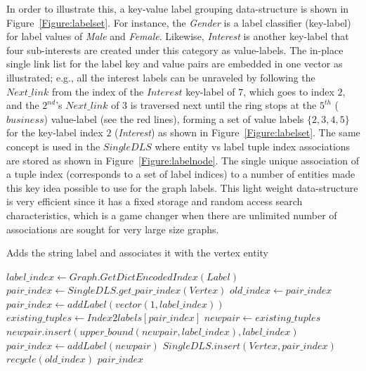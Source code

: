 \documentclass[preprint,3p,twocolumn]{elsarticle}
\begin{document}
In order to illustrate this, a key-value label grouping data-structure is shown in Figure~\ref{Figure:labelset}. For instance, the \textit{Gender} is a label classifier (key-label) for label values of \textit{Male} and \textit{Female}. Likewise, \textit{Interest} is another key-label that four sub-interests are created under this category as value-labels. The in-place single link list for the label key and value pairs are embedded  in one vector as illustrated; e.g., all the interest labels can be unraveled by following the $Next\_link$ from the index of the $Interest$ key-label of $7$, which goes to index $2$, and the $2^{nd}$'s $Next\_link$ of $3$ is traversed next until the ring stops at the $5^{th}$ ($business$) value-label (see the red lines), forming a set of value labels $\{2,3,4,5\}$ for the key-label index $2$ (\textit{Interest}) as shown in Figure~\ref{Figure:labelset}.  The same concept is used in the $SingleDLS$ where entity vs label tuple index associations are stored as shown in Figure~\ref{Figure:labelnode}. The single unique association of  a tuple index (corresponds to a set of label indices) to a number of entities made this key idea possible to use for the graph labels. This light weight data-structure is very efficient since it has a fixed storage and random access search characteristics, which is a game changer when there are unlimited number of associations are sought for very large size graphs.

    
\begin{algorithm*}
\caption{Adds the string label and associates it with the vertex entity}
\begin{algorithmic}[1]
\State $label\_index \gets Graph.GetDictEncodedIndex(Label)$
\State $pair\_index \gets SingleDLS.get\_pair\_index(Vertex)$
\State $old\_index \gets pair\_index$
    \State $pair\_index \gets addLabel(vector(1,label\_index))$
\Else
    \State $existing\_tuples \gets Index2labels[pair\_index]$
      \State $newpair \gets existing\_tuples$
      \State $newpair.insert(upper\_bound(newpair,label\_index),
      label\_index)$
      \State $pair\_index \gets addLabel(newpair)$
    \EndIf
\EndIf
\State $SingleDLS.insert(Vertex, pair\_index)$
   \State $recycle(old\_index)$ 
\EndIf
  \State \Return $pair\_index$
\EndProcedure
\end{algorithmic}
\label{Algorithm:addvertex}
\end{algorithm*}
\end{document}
